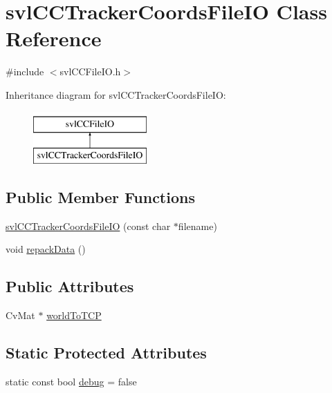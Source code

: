 \hypertarget{classsvl_c_c_tracker_coords_file_i_o}{}\section{svl\+C\+C\+Tracker\+Coords\+File\+I\+O Class Reference}
\label{classsvl_c_c_tracker_coords_file_i_o}


{\ttfamily \#include $<$svl\+C\+C\+File\+I\+O.\+h$>$}

Inheritance diagram for svl\+C\+C\+Tracker\+Coords\+File\+I\+O\+:\begin{figure}[H]
\begin{center}
\leavevmode
\includegraphics[height=2.000000cm]{d1/d44/classsvl_c_c_tracker_coords_file_i_o}
\end{center}
\end{figure}
\subsection*{Public Member Functions}
\begin{DoxyCompactItemize}
\item 
\hyperlink{classsvl_c_c_tracker_coords_file_i_o_ab7e12fde9eac5294ca3289f72819c542}{svl\+C\+C\+Tracker\+Coords\+File\+I\+O} (const char $\ast$filename)
\item 
void \hyperlink{classsvl_c_c_tracker_coords_file_i_o_a20551f5db6ea17d800c833cdd8734fd2}{repack\+Data} ()
\end{DoxyCompactItemize}
\subsection*{Public Attributes}
\begin{DoxyCompactItemize}
\item 
Cv\+Mat $\ast$ \hyperlink{classsvl_c_c_tracker_coords_file_i_o_a52c6b69d40df95c9e2a2028415c3ac5f}{world\+To\+T\+C\+P}
\end{DoxyCompactItemize}
\subsection*{Static Protected Attributes}
\begin{DoxyCompactItemize}
\item 
static const bool \hyperlink{classsvl_c_c_tracker_coords_file_i_o_aa792add13a0e86c73730b6f090dda22e}{debug} = false
\end{DoxyCompactItemize}

